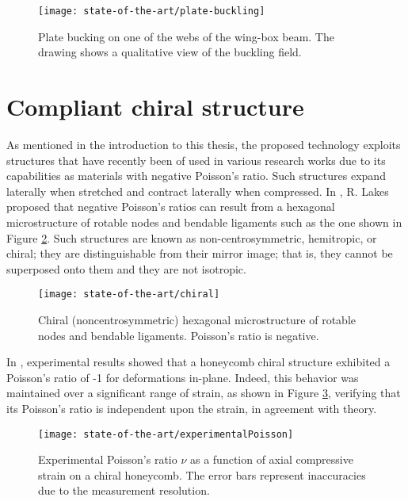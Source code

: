   \begin{figure}[!htpb]
    \centering
    \texttt{[image: state-of-the-art/plate-buckling]}
    \caption[Plate bucking on one of the webs of the wing-box beam]{Plate bucking on one of the webs of the wing-box beam. The drawing shows a qualitative view of the buckling field. \cite{Runkel2016}}\label{fig:plate-buckling}
  \end{figure}

\clearpage
\section{Compliant chiral structure} \label{sec:chiral_state}

  As mentioned in the introduction to this thesis, the proposed technology exploits structures that have recently been of used in various research works due to its capabilities as materials with negative Poisson's ratio. Such structures expand laterally when stretched and contract laterally when compressed. In \cite{Lakes1991}, R. Lakes proposed that negative Poisson's ratios can result from a hexagonal microstructure of rotable nodes and bendable ligaments such as the one shown in Figure \ref{fig:chiral}. Such structures are known as non-centrosymmetric, hemitropic, or chiral; they are distinguishable from their mirror image; that is, they cannot be superposed onto them and they are not isotropic.

  \begin{figure}[!htpb]
    \centering
    \texttt{[image: state-of-the-art/chiral]}
    \caption[Chiral structure of rotable nodes and bendable ligaments]{Chiral (noncentrosymmetric) hexagonal microstructure of rotable nodes and bendable ligaments. Poisson's ratio is negative. \cite{Lakes1991}}\label{fig:chiral}
  \end{figure}

  In \cite{Prall1997}, experimental results showed that a honeycomb chiral structure exhibited a Poisson's ratio of -1 for deformations in-plane. Indeed, this behavior was maintained over a significant range of strain, as shown in Figure \ref{fig:experimentalPoisson}, verifying that its Poisson's ratio is independent upon the strain, in agreement with theory. 

  \begin{figure}[!htpb]
    \centering
    \texttt{[image: state-of-the-art/experimentalPoisson]}
    \caption[Experimental Poisson's ratio $v$ as a function of axial compressive strain on a chiral honeycomb]{Experimental Poisson's ratio $\nu$ as a function of axial compressive strain on a chiral honeycomb. The error bars represent inaccuracies due to the measurement resolution. \cite{Prall1997}}\label{fig:experimentalPoisson}
  \end{figure}

